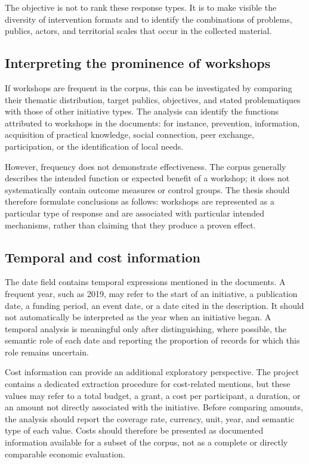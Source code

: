 \documentclass[
11pt,
english,
singlespacing,
headsepline,
]{MastersDoctoralThesis}
\begin{document}
The objective is not to rank these response types. It is to make visible the
diversity of intervention formats and to identify the combinations of problems,
publics, actors, and territorial scales that occur in the collected material.

\subsection{Interpreting the prominence of workshops}

If workshops are frequent in the corpus, this can be investigated by comparing
their thematic distribution, target publics, objectives, and stated
problematiques with those of other initiative types. The analysis can identify
the functions attributed to workshops in the documents: for instance,
prevention, information, acquisition of practical knowledge, social connection,
peer exchange, participation, or the identification of local needs.

However, frequency does not demonstrate effectiveness. The corpus generally
describes the intended function or expected benefit of a workshop; it does not
systematically contain outcome measures or control groups. The thesis should
therefore formulate conclusions as follows: workshops are represented as a
particular type of response and are associated with particular intended
mechanisms, rather than claiming that they produce a proven effect.

\subsection{Temporal and cost information}

The date field contains temporal expressions mentioned in the documents. A
frequent year, such as 2019, may refer to the start of an initiative, a
publication date, a funding period, an event date, or a date cited in the
description. It should not automatically be interpreted as the year when an
initiative began. A temporal analysis is meaningful only after distinguishing,
where possible, the semantic role of each date and reporting the proportion of
records for which this role remains uncertain.

Cost information can provide an additional exploratory perspective. The project
contains a dedicated extraction procedure for cost-related mentions, but these
values may refer to a total budget, a grant, a cost per participant, a duration,
or an amount not directly associated with the initiative. Before comparing
amounts, the analysis should report the coverage rate, currency, unit, year,
and semantic type of each value. Costs should therefore be presented as
documented information available for a subset of the corpus, not as a complete
or directly comparable economic evaluation.
\end{document}
